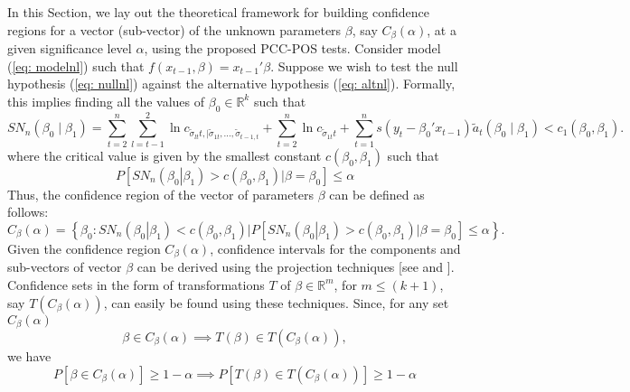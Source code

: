 \documentclass[harvard,11pt]{article}
\begin{document}
In this Section, we lay out the theoretical framework for building confidence regions for a vector
(sub-vector) of the unknown parameters $\beta $, say $C_{\beta }(\alpha )$, at a given
significance level $\alpha $, using the proposed PCC-POS tests. Consider model (\ref{eq: modelnl}) such that $f(x_{t-1},\beta)=x_{t-1}'\beta$.
Suppose we wish to test the null hypothesis (\ref{eq: nullnl})
against the alternative hypothesis (\ref{eq: altnl}). Formally, this implies finding all the values of $\beta _{0}\in \mathbb{R}^{k}$ such
that
\begin{equation}
SN_{n}(\beta_0\mid\beta _{1})=\sum\limits_{t=2}^{n}\sum\limits_{l=t-1}^{2}\ln c_{\tilde{\sigma}_{lt}t,\mid \tilde{\sigma}_{1t},...,\tilde{\sigma}_{t-1,t}}+\sum\limits_{t=2}^{n}\ln c_{\tilde{\sigma}_{1t}t}+\sum\limits_{t=1}^{n}s(y_t-\beta_0'x_{t-1})\tilde{a}_t(\beta_0\mid\beta_1)<c_1(\beta_0,\beta_1).
\end{equation}%
where the critical value is given by the smallest constant $c(\beta
_{0},\beta _{1})$ such that
\begin{equation*}
P\left[SN_{n}(\left. \beta _{0}\right\vert \beta
_{1})>c(\beta
_{0},\beta _{1})|\beta =\beta _{0}\right]\leq\alpha 
\end{equation*}%
Thus, the confidence region of the vector of parameters $\beta $ can be
defined as follows:
\begin{equation*}
C_{\beta }(\alpha )=\left\{ \beta _{0}:SN_{n}(\left. \beta _{0}\right\vert \beta
_{1})<c(\beta _{0},\beta _{1})|P[SN_{n}(\left. \beta _{0}\right\vert \beta
_{1})>c(\beta _{0},\beta
_{1})|\beta =\beta _{0}]\leq \alpha \right\} .
\end{equation*}%
Given the confidence region $C_{\beta }(\alpha )$, confidence intervals for the components and sub-vectors of vector $\beta $ can be derived using the projection techniques [see \citet{dufour2010exact} and \citet{coudin2009finite}]. Confidence sets in the form of transformations $T$ of $\beta\in%
\mathbb{R}^{m}$, for $m\leq (k+1)$, say $T(C_{\beta }(\alpha ))$, can easily be found using these techniques. Since, for any set $C_{\beta }(\alpha )$
\begin{equation}
\beta \in C_{\beta }(\alpha )\implies T(\beta )\in T(C_{\beta }(\alpha )),
\label{cr1}
\end{equation}%
we have
\begin{equation}
P[\beta \in C_{\beta }(\alpha )]\geq 1-\alpha \implies P%
[T(\beta )\in T(C_{\beta }(\alpha ))]\geq 1-\alpha   \label{cr2}
\end{equation}%
\end{document}
